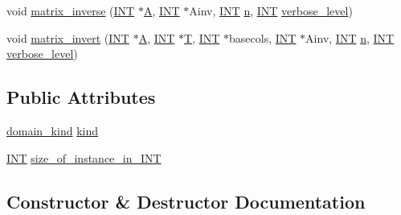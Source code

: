 \begin{DoxyCompactItemize}
void \mbox{\hyperlink{classa__domain_a3746a74f1de058547dd1b55436faada1}{matrix\+\_\+inverse}} (\mbox{\hyperlink{galois_8h_a09fddde158a3a20bd2dcadb609de11dc}{I\+NT}} $\ast$\mbox{\hyperlink{simeon_8_c_a97833f04c3a9c008df5521a2fc291bb4}{A}}, \mbox{\hyperlink{galois_8h_a09fddde158a3a20bd2dcadb609de11dc}{I\+NT}} $\ast$Ainv, \mbox{\hyperlink{galois_8h_a09fddde158a3a20bd2dcadb609de11dc}{I\+NT}} \mbox{\hyperlink{simeon_8_c_a7f2cd26777ce0ff3fdaf8d02aacbddfb}{n}}, \mbox{\hyperlink{galois_8h_a09fddde158a3a20bd2dcadb609de11dc}{I\+NT}} \mbox{\hyperlink{simeon_8_c_a818073fbcc2f439e7c56952f67386122}{verbose\+\_\+level}})
\item 
void \mbox{\hyperlink{classa__domain_af55f171ad67c2b35e762f1ba51aaa4c4}{matrix\+\_\+invert}} (\mbox{\hyperlink{galois_8h_a09fddde158a3a20bd2dcadb609de11dc}{I\+NT}} $\ast$\mbox{\hyperlink{simeon_8_c_a97833f04c3a9c008df5521a2fc291bb4}{A}}, \mbox{\hyperlink{galois_8h_a09fddde158a3a20bd2dcadb609de11dc}{I\+NT}} $\ast$\mbox{\hyperlink{pentomino__5x5_8_c_a2b44a927c3e8a68f69f9f943c32c696d}{T}}, \mbox{\hyperlink{galois_8h_a09fddde158a3a20bd2dcadb609de11dc}{I\+NT}} $\ast$basecols, \mbox{\hyperlink{galois_8h_a09fddde158a3a20bd2dcadb609de11dc}{I\+NT}} $\ast$Ainv, \mbox{\hyperlink{galois_8h_a09fddde158a3a20bd2dcadb609de11dc}{I\+NT}} \mbox{\hyperlink{simeon_8_c_a7f2cd26777ce0ff3fdaf8d02aacbddfb}{n}}, \mbox{\hyperlink{galois_8h_a09fddde158a3a20bd2dcadb609de11dc}{I\+NT}} \mbox{\hyperlink{simeon_8_c_a818073fbcc2f439e7c56952f67386122}{verbose\+\_\+level}})
\end{DoxyCompactItemize}
\subsection*{Public Attributes}
\begin{DoxyCompactItemize}
\item 
\mbox{\hyperlink{galois_8h_a3e2ab83f5066fe3dff37ac39cc40c140}{domain\+\_\+kind}} \mbox{\hyperlink{classa__domain_ae171c12ea2d65d6d228a9dc957353359}{kind}}
\item 
\mbox{\hyperlink{galois_8h_a09fddde158a3a20bd2dcadb609de11dc}{I\+NT}} \mbox{\hyperlink{classa__domain_a9d423d4d842c893315b9d3873ce8e2fb}{size\+\_\+of\+\_\+instance\+\_\+in\+\_\+\+I\+NT}}
\end{DoxyCompactItemize}


\subsection{Constructor \& Destructor Documentation}
\mbox{\label{classa__domain_ac200ef828b9d0c3afd9d48a6c18adc95}} 
